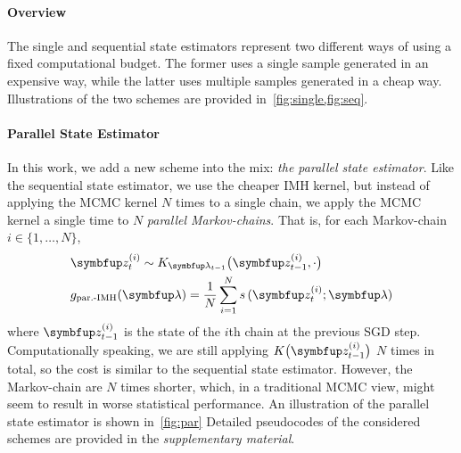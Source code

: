
\paragraph{Overview}
The single and sequential state estimators represent two different ways of using a fixed computational budget.
The former uses a single sample generated in an expensive way, while the latter uses multiple samples generated in a cheap way.
Illustrations of the two schemes are provided in~\cref{fig:single,fig:seq}.

\vspace{-0.05in}
\paragraph{Parallel State Estimator}
In this work, we add a new scheme into the mix: \textit{the parallel state estimator}.
Like the sequential state estimator, we use the cheaper IMH kernel, but instead of applying the MCMC kernel \(N\) times to a single chain, we apply the MCMC kernel a single time to \(N\) \textit{parallel Markov-chains}.
That is, for each Markov-chain \(i \in \{1, \ldots, N\}\),
%
\vspace{-0.05in}
\begin{align*}
  &\vz_{t}^{(i)} \sim K_{\vlambda_{t-1}}\big(\vz_{t-1}^{(i)}, \cdot \big) \\
  &g_{\text{par.-IMH}}(\vlambda) = \frac{1}{N} \sum_{i=1}^N s\,(\vz_{t}^{(i)}; \vlambda)
\end{align*}
%
where \(\vz_{t-1}^{(i)}\) is the state of the \(i\)th chain at the previous SGD step.
Computationally speaking, we are still applying \(K\big(\vz_{t-1}^{(i)}\big)\) \(N\) times in total, so the cost is similar to the sequential state estimator.
However, the Markov-chain are \(N\) times shorter, which, in a traditional MCMC view, might seem to result in worse statistical performance.
An illustration of the parallel state estimator is shown in~\cref{fig:par}
Detailed pseudocodes of the considered schemes are provided in the \textit{supplementary material}.

%

%
\vspace{-0.05in}
